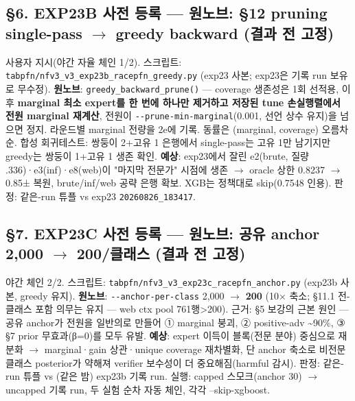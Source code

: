 \subsection{§6. EXP23B 사전 등록 — 원노브: §12 pruning single-pass  \ensuremath{\rightarrow}  greedy backward (결과 전 고정)}
사용자 지시(야간 자율 체인 1/\allowbreak{}2). 스크립트: \texttt{tabpfn/\allowbreak{}\allowbreak{}n\allowbreak{}fv3\_\allowbreak{}\allowbreak{}v3\_\allowbreak{}\allowbreak{}e\allowbreak{}xp23b\_\allowbreak{}\allowbreak{}ra\allowbreak{}cepfn\_\allowbreak{}\allowbreak{}gr\allowbreak{}eedy.\allowbreak{}py} (exp23 사본; exp23은 기록 run 보유로 무수정). \textbf{원노브}: \texttt{greedy\_\allowbreak{}\allowbreak{}b\allowbreak{}ackward\_\allowbreak{}\allowbreak{}prune()} — coverage 생존성은 1회 선적용, 이후 \textbf{marginal 최소 expert를 한 번에 하나만 제거하고 저장된 tune 손실행렬에서 전원 marginal 재계산}, 전원이 \texttt{-\allowbreak{}-\allowbreak{}prune-\allowbreak{}min-\allowbreak{}marg\allowbreak{}inal}(0.001, 선언 상수 유지)을 넘으면 정지. 라운드별 marginal 전량을 2e에 기록. 동률은 (marginal, coverage) 오름차순. 합성 회귀테스트: 쌍둥이 2+\allowbreak{}고유 1 은행에서 single-pass는 고유 1만 남기지만 greedy는 쌍둥이 1+\allowbreak{}고유 1 생존 확인. \textbf{예상}: exp23에서 잘린 e2(brute, 질량 .336)·e3(inf)·e8(web)이 "마지막 전문가" 시점에 생존  \ensuremath{\rightarrow}  oracle 상한 0.8237 \ensuremath{\rightarrow} 0.85± 복원, brute/\allowbreak{}inf/\allowbreak{}web 공략 은행 확보. XGB는 정책대로 skip(0.7548 인용). 판정: 같은-run 튜플 vs exp23 \texttt{20260826\allowbreak{}\_\allowbreak{}\allowbreak{}183417}.

\subsection{§7. EXP23C 사전 등록 — 원노브: 공유 anchor 2,000  \ensuremath{\rightarrow}  200/\allowbreak{}클래스 (결과 전 고정)}
야간 체인 2/\allowbreak{}2. 스크립트: \texttt{tabpfn/\allowbreak{}\allowbreak{}n\allowbreak{}fv3\_\allowbreak{}\allowbreak{}v3\_\allowbreak{}\allowbreak{}e\allowbreak{}xp23c\_\allowbreak{}\allowbreak{}ra\allowbreak{}cepfn\_\allowbreak{}\allowbreak{}an\allowbreak{}chor.\allowbreak{}py} (exp23b 사본, greedy 유지). \textbf{원노브}: \texttt{-\allowbreak{}-\allowbreak{}anchor\allowbreak{}-\allowbreak{}per-\allowbreak{}cla\allowbreak{}ss} 2,000 \ensuremath{\rightarrow} \textbf{200} (10× 축소; §11.1 전-클래스 포함 의무는 유지 — web ctx pool 761행>200). 근거: §5 보강의 근본 원인 — 공유 anchor가 전원을 일반의로 만들어 ① marginal 붕괴, ② positive-adv \textasciitilde{}90\%, ③ §7 prior 무효과(β=\allowbreak{}0)를 모두 유발. \textbf{예상}: expert 이득이 블록(전문 분야) 중심으로 재분화  \ensuremath{\rightarrow}  marginal·gain 상관·unique coverage 재차별화, 단 anchor 축소로 비전문 클래스 posterior가 약해져 verifier 보수성이 더 중요해짐(harmful 감시). 판정: 같은-run 튜플 vs (같은 밤) exp23b 기록 run. 실행: capped 스모크(anchor 30)  \ensuremath{\rightarrow}  uncapped 기록 run, 두 실험 순차 자동 체인, 각각 --skip-xgboost.

